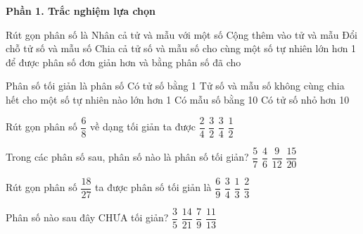 \textbf{Phần 1. Trắc nghiệm lựa chọn}

\begin{ex} %
Rút gọn phân số là
\choice
{Nhân cả tử và mẫu với một số}
{Cộng thêm vào tử và mẫu}
{Đổi chỗ tử số và mẫu số}
{\True Chia cả tử số và mẫu số cho cùng một số tự nhiên lớn hơn 1 để được phân số đơn giản hơn và bằng phân số đã cho}
\end{ex}

\begin{ex} %
Phân số tối giản là phân số
\choice
{Có tử số bằng 1}
{\True Tử số và mẫu số không cùng chia hết cho một số tự nhiên nào lớn hơn 1}
{Có mẫu số bằng 10}
{Có tử số nhỏ hơn 10}
\end{ex}

\begin{ex} %
Rút gọn phân số $\dfrac{6}{8}$ về dạng tối giản ta được
\choice
{$\dfrac{2}{4}$}
{$\dfrac{3}{2}$}
{\True $\dfrac{3}{4}$}
{$\dfrac{1}{2}$}
\end{ex}

\begin{ex} %
Trong các phân số sau, phân số nào là phân số tối giản?
\choice
{\True $\dfrac{5}{7}$}
{$\dfrac{4}{6}$}
{$\dfrac{9}{12}$}
{$\dfrac{15}{20}$}
\end{ex}

\begin{ex} %
Rút gọn phân số $\dfrac{18}{27}$ ta được phân số tối giản là
\choice
{$\dfrac{6}{9}$}
{$\dfrac{3}{4}$}
{$\dfrac{1}{3}$}
{\True $\dfrac{2}{3}$}
\end{ex}

\begin{ex} %
Phân số nào sau đây CHƯA tối giản?
\choice
{$\dfrac{3}{5}$}
{\True $\dfrac{14}{21}$}
{$\dfrac{7}{9}$}
{$\dfrac{11}{13}$}
\end{ex}

